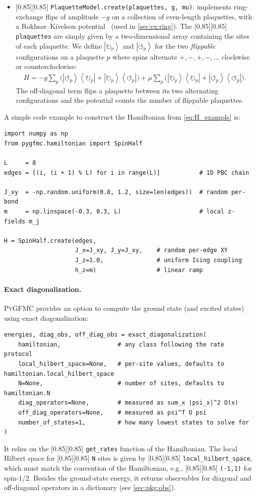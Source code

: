 \documentclass{SciPost}
\newcommand{\pyinline}[1]{\begingroup\setlength{\fboxsep}{0pt}%
  \colorbox{gray!15}{\raisebox{0pt}[0.85\ht\strutbox][0.85\dp\strutbox]{%
    \hspace{1pt}\lstinline{#1}\hspace{1pt}}}\endgroup}
\newcommand{\cw}{\circlearrowright}
\newcommand{\ccw}{\circlearrowleft}
\providecommand{\ket}[1]{\left|#1\right\rangle}
\providecommand{\bra}[1]{\left\langle#1\right|}
\providecommand{\PyGFMC}{\textsc{PyGFMC}}
\begin{document}
\begin{itemize}
\item \pyinline{PlaquetteModel.create(plaquettes, g, mu)}: implements ring-exchange flips of amplitude $-g$ on a collection of even-length plaquettes, with a Rokhsar--Kivelson potential~\cite{rokhsar_superconductivity_1988} (used in \autoref{sec:ex:ring}).
		The \pyinline{plaquettes} are simply given by a two-dimensional array containing the sites of each plaquette.
		We define $\ket{\cw_p}$ and $\ket{\ccw_p}$ for the two \emph{flippable} configurations on a plaquette $p$ where spins alternate $+,-,+,-,\dots$ clockwise or counterclockwise:
	\begin{align}
		H=-g\sum_{p}\Big(\ket{\ccw_p}\!\bra{\cw_p}+\ket{\cw_p}\!\bra{\ccw_p}\Big)
		 +\mu\sum_p\Big(\ket{\cw_p}\!\bra{\cw_p}+\ket{\ccw_p}\!\bra{\ccw_p}\Big).
		\label{eq:H_plaquette_generic}
	\end{align}
	The off-diagonal term flips a plaquette between its two alternating	configurations and the potential counts the number of flippable plaquettes.
\end{itemize}

A simple code example to construct the Hamiltonian from \autoref{eq:H_example} is:
\begin{lstlisting}
import numpy as np
from pygfmc.hamiltonian import SpinHalf

L     = 8
edges = [(i, (i + 1) % L) for i in range(L)]           # 1D PBC chain

J_xy  = -np.random.uniform(0.8, 1.2, size=len(edges))  # random per-bond
m     = np.linspace(-0.3, 0.3, L)                      # local z-fields m_j

H = SpinHalf.create(edges,
                    J_x=J_xy, J_y=J_xy,    # random per-edge XY
                    J_z=1.0,               # uniform Ising coupling
                    h_z=m)                 # linear ramp
\end{lstlisting}

\paragraph{Exact diagonalization.} \PyGFMC{} provides an option to compute the ground state (and excited states) using exact diagonalization:
\begin{lstlisting}
energies, diag_obs, off_diag_obs = exact_diagonalization(
    hamiltonian,                # any class following the rate protocol
    local_hilbert_space=None,   # per-site values, defaults to hamiltonian.local_hilbert_space
    N=None,                     # number of sites, defaults to hamiltonian.N
    diag_operators=None,        # measured as sum_x |psi_x|^2 O(x)
    off_diag_operators=None,    # measured as psi^T O psi
    number_of_states=1,         # how many lowest states to solve for
)
\end{lstlisting}
It relies on the \pyinline{get_rates} function of the Hamiltonian.
%
The local Hilbert space for \pyinline{N} sites is given by \pyinline{local_hilbert_space}, which must match the convention of the Hamiltonian, e.g., \pyinline{(-1,1)} for spin-1/2.
%
Besides the ground-state energy, it returns observables for diagonal and off-diagonal operators in a dictionary (see \autoref{sec:pkg:obs}).
\end{document}
